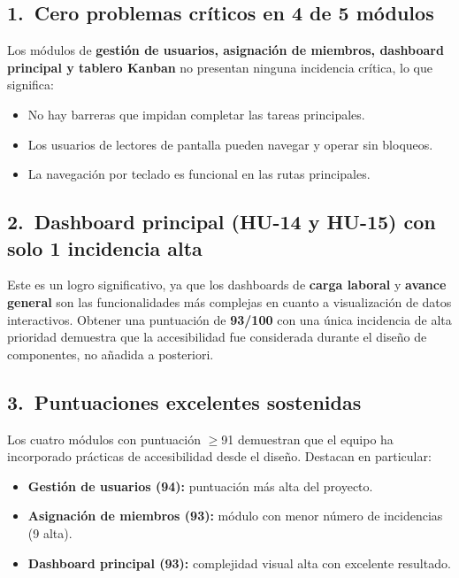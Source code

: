 \documentclass[12pt, a4paper]{article}
\begin{document}
\subsection{1.\ Cero problemas críticos en 4 de 5 módulos}

\begin{logrobox}
Los módulos de \textbf{gestión de usuarios, asignación de miembros, dashboard principal y
tablero Kanban} no presentan ninguna incidencia crítica, lo que significa:
\begin{itemize}[leftmargin=1.4em, topsep=2pt]
  \item No hay barreras que impidan completar las tareas principales.
  \item Los usuarios de lectores de pantalla pueden navegar y operar sin bloqueos.
  \item La navegación por teclado es funcional en las rutas principales.
\end{itemize}
\end{logrobox}

\subsection{2.\ Dashboard principal (HU-14 y HU-15) con solo 1 incidencia alta}

\begin{logrobox}
Este es un logro significativo, ya que los dashboards de \textbf{carga laboral} y
\textbf{avance general} son las funcionalidades más complejas en cuanto a visualización
de datos interactivos. Obtener una puntuación de \textbf{93/100} con una única incidencia
de alta prioridad demuestra que la accesibilidad fue considerada durante el diseño de
componentes, no añadida a posteriori.
\end{logrobox}

\subsection{3.\ Puntuaciones excelentes sostenidas}

\begin{logrobox}
Los cuatro módulos con puntuación $\geq$91 demuestran que el equipo ha incorporado
prácticas de accesibilidad desde el diseño. Destacan en particular:
\begin{itemize}[leftmargin=1.4em, topsep=2pt]
  \item \textbf{Gestión de usuarios (94):} puntuación más alta del proyecto.
  \item \textbf{Asignación de miembros (93):} módulo con menor número de incidencias (9 alta).
  \item \textbf{Dashboard principal (93):} complejidad visual alta con excelente resultado.
\end{itemize}
\end{logrobox}
\end{document}
